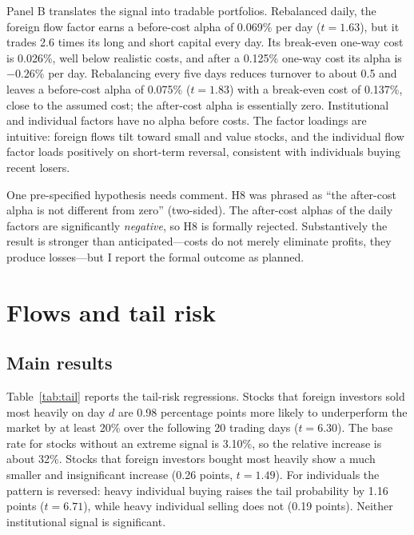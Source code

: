 \documentclass[11pt]{article}
\begin{document}
Panel B translates the signal into tradable portfolios. Rebalanced daily, the foreign flow factor earns a before-cost
alpha of 0.069\% per day ($t=1.63$), but it trades 2.6 times its long and short capital every day. Its break-even
one-way cost is 0.026\%, well below realistic costs, and after a 0.125\% one-way cost its alpha is $-0.26\%$ per day.
Rebalancing every five days reduces turnover to about 0.5 and leaves a before-cost alpha of 0.075\% ($t=1.83$) with a
break-even cost of 0.137\%, close to the assumed cost; the after-cost alpha is essentially zero. Institutional and
individual factors have no alpha before costs. The factor loadings are intuitive: foreign flows tilt toward small and
value stocks, and the individual flow factor loads positively on short-term reversal, consistent with individuals
buying recent losers.

One pre-specified hypothesis needs comment. H8 was phrased as ``the after-cost alpha is not different from zero''
(two-sided). The after-cost alphas of the daily factors are significantly \emph{negative}, so H8 is formally rejected.
Substantively the result is stronger than anticipated---costs do not merely eliminate profits, they produce losses---but
I report the formal outcome as planned.



\section{Flows and tail risk}\label{sec:tail}

\subsection{Main results}
Table~\ref{tab:tail} reports the tail-risk regressions. Stocks that foreign investors sold most heavily on day $d$ are
0.98 percentage points more likely to underperform the market by at least 20\% over the following 20 trading days
($t=6.30$). The base rate for stocks without an extreme signal is 3.10\%, so the relative increase is about 32\%.
Stocks that foreign investors bought most heavily show a much smaller and insignificant increase (0.26 points,
$t=1.49$). For individuals the pattern is reversed: heavy individual buying raises the tail probability by 1.16 points
($t=6.71$), while heavy individual selling does not (0.19 points). Neither institutional signal is significant.
\end{document}
